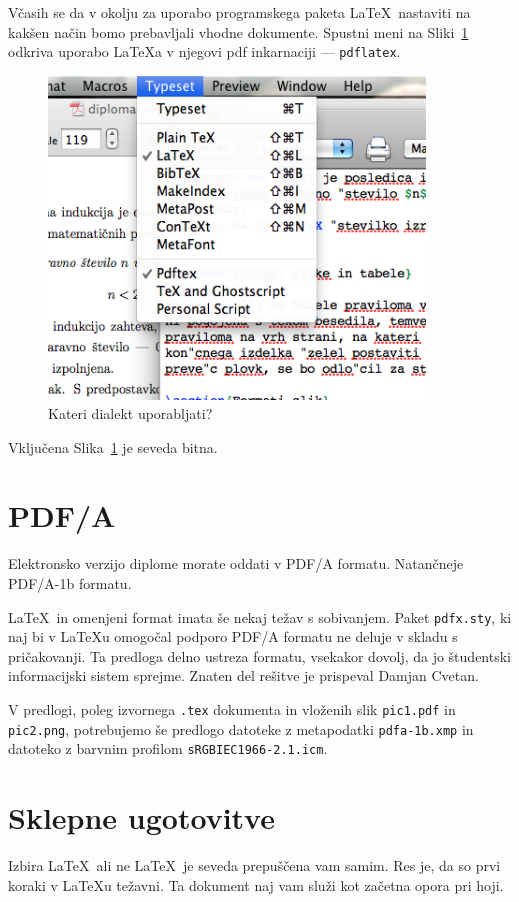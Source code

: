 \documentclass[a4paper, 12pt]{book}
\begin{document}
Včasih se da v okolju za uporabo programskega paketa \LaTeX\ nastaviti na kakšen način bomo prebavljali vhodne dokumente. Spustni meni na Sliki~\ref{pic2} odkriva uporabo \LaTeX{}a v njegovi pdf inkarnaciji --- {\tt pdflatex}.
\begin{figure}
\begin{center}
\includegraphics[width=10cm]{pic2.png}
\end{center}
\caption{Kateri dialekt uporabljati?}
\label{pic2}
\end{figure}

Vključena Slika~\ref{pic2} je seveda bitna.
%

\chapter{PDF/A}
Elektronsko verzijo diplome morate oddati v PDF/A formatu. Natančneje PDF/A-1b formatu. 

\LaTeX\ in omenjeni format imata še nekaj težav s sobivanjem. Paket \texttt{pdfx.sty}, ki naj bi v \LaTeX u omogočal podporo PDF/A formatu ne deluje v skladu s pričakovanji. Ta predloga delno ustreza formatu, vsekakor dovolj, da jo študentski informacijski sistem sprejme. Znaten del rešitve je prispeval Damjan Cvetan.

V predlogi, poleg izvornega \texttt{.tex} dokumenta in vloženih slik \texttt{pic1.pdf} in \texttt{pic2.png}, potrebujemo še predlogo datoteke z metapodatki \texttt{pdfa-1b.xmp} in datoteko z barvnim profilom \texttt{sRGBIEC1966-2.1.icm}.

\chapter{Sklepne ugotovitve}
Izbira \LaTeX\ ali ne \LaTeX\ je seveda prepuščena vam samim. Res je, da so prvi koraki v \LaTeX{}u težavni. Ta dokument naj vam služi kot začetna opora pri hoji.

{}

\end{document}
